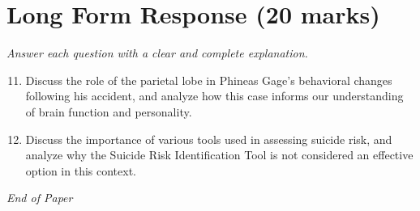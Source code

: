 \documentclass[12pt]{article}
\begin{document}
\section*{Long Form Response (20 marks)}
\textit{Answer each question with a clear and complete explanation.}
\begin{enumerate}[label=\arabic*.]
\setcounter{enumi}{10}
\item Discuss the role of the parietal lobe in Phineas Gage's behavioral changes following his accident, and analyze how this case informs our understanding of brain function and personality.
\item Discuss the importance of various tools used in assessing suicide risk, and analyze why the Suicide Risk Identification Tool is not considered an effective option in this context.
\end{enumerate}

\vfill
\noindent\textit{End of Paper}
\end{document}
